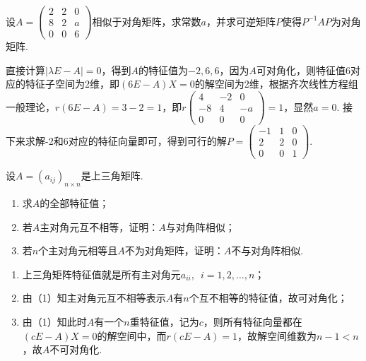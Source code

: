 \begin{exercise}
\begin{exgroup}
        \item 设$A=\begin{pmatrix}
                2 & 2 & 0 \\ 8 & 2 & a \\ 0 & 0 & 6
            \end{pmatrix}$相似于对角矩阵，求常数$a$，并求可逆矩阵$P$使得$P^{-1}AP$为对角矩阵.
        \begin{answer}
            直接计算$|\lambda E-A|=0$，得到$A$的特征值为$-2,6,6$，因为$A$可对角化，则特征值6对应的特征子空间为2维，即$(6E-A)X=0$的解空间为2维，根据齐次线性方程组一般理论，$r(6E-A)=3-2=1$，即$r\begin{pmatrix}
                4 & -2 & 0 \\ -8 & 4 & -a \\ 0 & 0 & 0
            \end{pmatrix}=1$，显然$a=0$. 接下来求解-2和6对应的特征向量即可，得到可行的解$P=\begin{pmatrix}
                -1 & 1 & 0 \\ 2 & 2 & 0 \\ 0 & 0 & 1
            \end{pmatrix}$.
        \end{answer}

        \item 设$A=(a_{ij})_{n\times n}$是上三角矩阵.
        \begin{enumerate}
            \item 求$A$的全部特征值；

            \item 若$A$主对角元互不相等，证明：$A$与对角阵相似；

            \item 若$n$个主对角元相等且$A$不为对角矩阵，证明：$A$不与对角阵相似.
        \end{enumerate}
        \begin{answer}
            \begin{enumerate}
                \item 上三角矩阵特征值就是所有主对角元$a_{ii},\enspace i=1,2,\ldots,n$；

                \item 由（1）知主对角元互不相等表示$A$有$n$个互不相等的特征值，故可对角化；

                \item 由（1）知此时$A$有一个$n$重特征值，记为$c$，则所有特征向量都在$(cE-A)X=0$的解空间中，而$r(cE-A)=1$，故解空间维数为$n-1<n$，故$A$不可对角化.
            \end{enumerate}
        \end{answer}


\end{exgroup}
\end{exercise}
